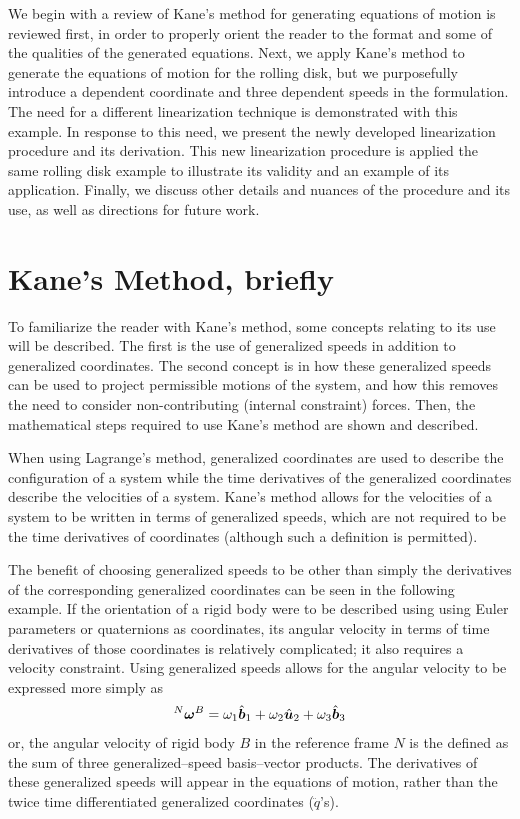 We begin with a review of Kane's method for generating equations of motion is
reviewed first, in order to properly orient the reader to the format and some
of the qualities of the generated equations. Next, we apply Kane's method to
generate the equations of motion for the rolling disk, but we purposefully
introduce a dependent coordinate and three dependent speeds in the formulation.
The need for a different linearization technique is demonstrated with this
example. In response to this need, we present the newly developed linearization
procedure and its derivation. This new linearization procedure is applied the
same rolling disk example to illustrate its validity and an example of its
application. Finally, we discuss other details and nuances of the procedure and
its use, as well as directions for future work.

\section{Kane's Method, briefly}
\label{sec:kane_method}
To familiarize the reader with Kane's method, some concepts relating to its use
will be described.  The first is the use of generalized speeds in addition to
generalized coordinates.  The second concept is in how these generalized speeds
can be used to project permissible motions of the system, and how this removes
the need to consider non-contributing (internal constraint) forces.  Then, the
mathematical steps required to use Kane's method are shown and described.

When using Lagrange's method, generalized coordinates are used to describe the
configuration of a system while the time derivatives of the generalized
coordinates describe the velocities of a system.  Kane's method allows for the
velocities of a system to be written in terms of generalized speeds, which are
not required to be the time derivatives of coordinates (although such a
definition is permitted).

The benefit of choosing generalized speeds to be other than simply the
derivatives of the corresponding generalized coordinates can be seen in the
following example. If the orientation of a rigid body were to be described
using using Euler parameters or quaternions as coordinates, its angular
velocity in terms of time derivatives of those coordinates is relatively
complicated; it also requires a velocity constraint. Using generalized speeds
allows for the angular velocity to be expressed more simply as
\begin{align}
\label{eq:ex1}
{^N}\boldsymbol{\omega}^B = \omega_1 \hat{\boldsymbol{b}}_{1} + \omega_2 \hat{\boldsymbol{u}}_{2} + \omega_3 \hat{\boldsymbol{b}}_{3}
\end{align}
or, the angular velocity of rigid body $B$ in the reference frame $N$ is the
defined as the sum of three generalized--speed basis--vector products.
The derivatives of these generalized speeds will appear in the equations
of motion, rather than the twice time differentiated generalized coordinates
($\ddot{{q}}$'s).

